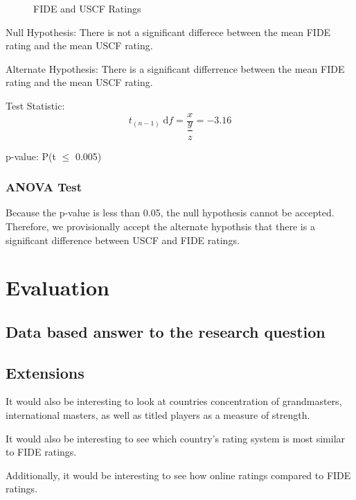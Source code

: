 \documentclass[12pt]{article}
\begin{document}
\begin{figure}[H]
\centering
{}
\caption{FIDE and USCF Ratings}
\end{figure}

Null Hypothesis: There is not a significant differece between the mean FIDE rating and the mean USCF rating.

Alternate Hypothesis: There is a significant differrence between the mean FIDE rating and the mean USCF rating. 

Test Statistic: 
\begin{equation}
    t_{(n-1)} \; \textrm{d}f = \dfrac{x}{\dfrac{y}{z}} = -3.16
\end{equation}

p-value: P(t \(\leq\) 0.005)
\subsubsection{ANOVA Test}

Because the p-value is less than 0.05, the null hypothesis cannot be accepted. Therefore, we provisionally accept the alternate hypothsis that there is a significant difference between USCF and FIDE ratings.

\section{Evaluation}
\subsection{Data based answer to the research question}
\subsection{Extensions}
It would also be interesting to look at countries concentration of grandmasters, international masters, as well as titled players as a measure of strength. 

It would also be interesting to see which country's rating system is most similar to FIDE ratings.

Additionally, it would be interesting to see how online ratings compared to FIDE ratings.
\end{document}
